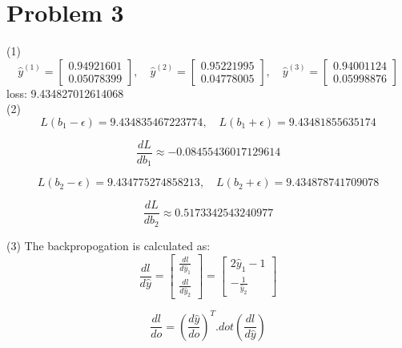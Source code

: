 \documentclass[12pt]{article}
\begin{document}
\section{Problem 3}
(1)\\
\begin{equation}
    \hat{y}^{(1)}=\begin{bmatrix} 0.94921601 \\ 0.05078399 \end{bmatrix}, \quad
    \hat{y}^{(2)}=\begin{bmatrix} 0.95221995 \\ 0.04778005 \end{bmatrix}, \quad
    \hat{y}^{(3)}=\begin{bmatrix} 0.94001124 \\ 0.05998876 \end{bmatrix}
\end{equation}
loss:  9.434827012614068\\
(2)
\begin{equation}
    L(b_1-\epsilon)= 9.434835467223774, \quad
    L(b_1+\epsilon)= 9.43481855635174
\end{equation}

\begin{equation}
    \frac{dL}{db_1}\approx -0.08455436017129614
\end{equation}

\begin{equation}
    L(b_2-\epsilon)= 9.434775274858213 , \quad
    L(b_2+\epsilon)= 9.434878741709078
\end{equation}

\begin{equation}
    \frac{dL}{db_2}\approx 0.5173342543240977
\end{equation}

(3) The backpropogation is calculated as:\\
\begin{equation}
    \frac{dl}{d\hat y}=
    \begin{bmatrix} \frac{dl}{d\hat y_1} \\ \frac{dl}{d\hat y_2} \end{bmatrix}=
    \begin{bmatrix} 2\hat y_1-1 \\ -\frac{1}{\hat y_2} \end{bmatrix}
\end{equation}

\begin{equation}
    \frac{dl}{do}=(\frac{d\hat y}{do})^T.dot(\frac{dl}{d\hat y})
\end{equation}
\end{document}

